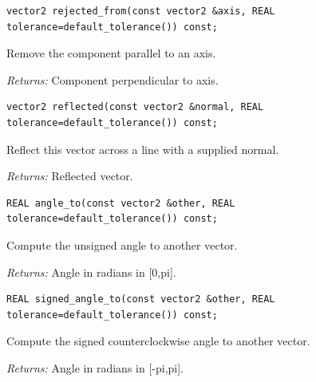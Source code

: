 \par\noindent\begin{minipage}{\linewidth}
\begin{lstlisting}[style=apireference]
vector2 rejected_from(const vector2 &axis, REAL tolerance=default_tolerance()) const;
\end{lstlisting}
{\footnotesize Remove the component parallel to an axis.\par}
{\footnotesize\textit{Returns:} Component perpendicular to axis.\par}
\end{minipage}\par\vspace{1pt}
\par\noindent\begin{minipage}{\linewidth}
\begin{lstlisting}[style=apireference]
vector2 reflected(const vector2 &normal, REAL tolerance=default_tolerance()) const;
\end{lstlisting}
{\footnotesize Reflect this vector across a line with a supplied normal.\par}
{\footnotesize\textit{Returns:} Reflected vector.\par}
\end{minipage}\par\vspace{1pt}
\par\noindent\begin{minipage}{\linewidth}
\begin{lstlisting}[style=apireference]
REAL angle_to(const vector2 &other, REAL tolerance=default_tolerance()) const;
\end{lstlisting}
{\footnotesize Compute the unsigned angle to another vector.\par}
{\footnotesize\textit{Returns:} Angle in radians in [0,pi].\par}
\end{minipage}\par\vspace{1pt}
\par\noindent\begin{minipage}{\linewidth}
\begin{lstlisting}[style=apireference]
REAL signed_angle_to(const vector2 &other, REAL tolerance=default_tolerance()) const;
\end{lstlisting}
{\footnotesize Compute the signed counterclockwise angle to another vector.\par}
{\footnotesize\textit{Returns:} Angle in radians in [-pi,pi].\par}
\end{minipage}\par\vspace{1pt}

